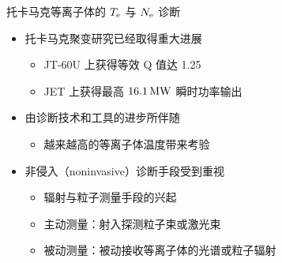 \begin{CJK*}{UTF8}{kai}
\begin{frame}{托卡马克等离子体的 $T_{\rm e}$ 与 $N_{\rm e}$ 诊断}
    \begin{itemize}
      \item 托卡马克聚变研究已经取得重大进展
        \begin{itemize}
          \item JT-60U 上获得等效 Q 值达 1.25 
          \item JET 上获得最高 $16.1\,{\rm MW}$ 瞬时功率输出 
        \end{itemize}
      \bigskip
      \item 由诊断技术和工具的进步所伴随
        \begin{itemize}
          \item 越来越高的等离子体温度带来考验
        \end{itemize}
      \bigskip
      \item 非侵入（noninvasive）诊断手段受到重视
        \begin{itemize}
          \item 辐射与粒子测量手段的兴起
          \item 主动测量：射入探测粒子束或激光束
          \item 被动测量：被动接收等离子体的光谱或粒子辐射
        \end{itemize}
    \end{itemize}
%    	
%    	
%    	
\end{frame}


\end{CJK*}
